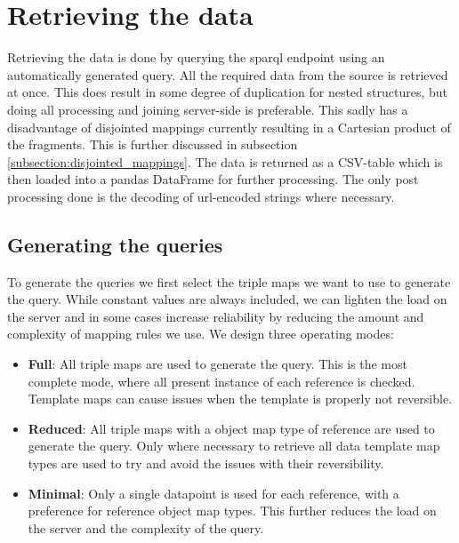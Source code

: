\section{Retrieving the data}
\label{section:retrieving_data}
Retrieving the data is done by querying the \acrshort{sparql} endpoint using an automatically generated query. All the required data from the source is retrieved at once. This does result in some degree of duplication for nested structures, but doing all processing and joining server-side is preferable. This sadly has a disadvantage of disjointed mappings currently resulting in a Cartesian product of the fragments. This is further discussed in subsection \ref{subsection:disjointed_mappings}. The data is returned as a CSV-table which is then loaded into a pandas DataFrame for further processing. The only post processing done is the decoding of url-encoded strings where necessary. 

\subsection{Generating the queries}
\label{subsection:generating_queries}
To generate the queries we first select the triple maps we want to use to generate the query. While constant values are always included, we can lighten the load on the server and in some cases increase reliability by reducing the amount and complexity of mapping rules we use. We design three operating modes:
\begin{itemize}
    \item \textbf{Full}: All triple maps are used to generate the query. This is the most complete mode, where all present instance of each reference is checked. Template maps can cause issues when the template is properly not reversible.
    \item \textbf{Reduced}: All triple maps with a object map type of reference are used to generate the query. Only where necessary to retrieve all data template map types are used to try and avoid the issues with their reversibility.
    \item \textbf{Minimal}: Only a single datapoint is used for each reference, with a preference for reference object map types. This further reduces the load on the server and the complexity of the query. 
\end{itemize}

